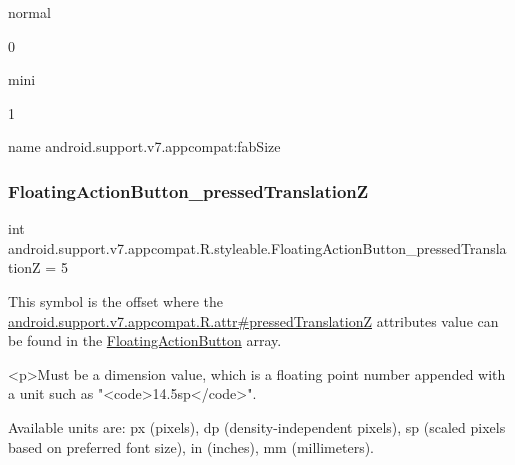 {\ttfamily normal}

0

{\ttfamily mini}

1

name android.\+support.\+v7.\+appcompat\+:fab\+Size \mbox{\label{classandroid_1_1support_1_1v7_1_1appcompat_1_1R_1_1styleable_a4b64b16277ffe93157834b6ae898ccb9}} 
\subsubsection{\texorpdfstring{Floating\+Action\+Button\+\_\+pressed\+TranslationZ}{FloatingActionButton\_pressedTranslationZ}}
{\footnotesize\ttfamily int android.\+support.\+v7.\+appcompat.\+R.\+styleable.\+Floating\+Action\+Button\+\_\+pressed\+TranslationZ = 5\hspace{0.3cm}{\ttfamily [static]}}

This symbol is the offset where the \hyperlink{classandroid_1_1support_1_1v7_1_1appcompat_1_1R_1_1attr_a01bd72cc6ce7f445291fc2c14a64a7e3}{android.\+support.\+v7.\+appcompat.\+R.\+attr\#pressed\+TranslationZ} attribute\textquotesingle{}s value can be found in the \hyperlink{classandroid_1_1support_1_1v7_1_1appcompat_1_1R_1_1styleable_a9bfca89352160169125a89277e9fb2a1}{Floating\+Action\+Button} array.

\begin{DoxyVerb}      <p>Must be a dimension value, which is a floating point number appended with a unit such as "<code>14.5sp</code>".
\end{DoxyVerb}
 Available units are\+: px (pixels), dp (density-\/independent pixels), sp (scaled pixels based on preferred font size), in (inches), mm (millimeters). 

